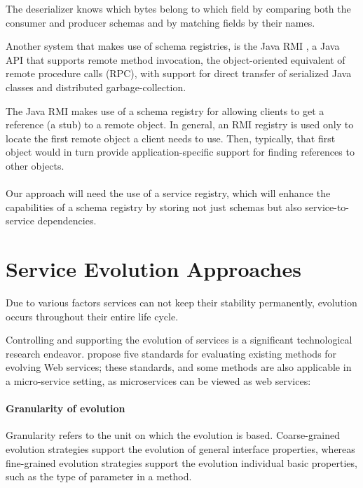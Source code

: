 The deserializer knows which bytes belong to which field by comparing both the consumer and producer schemas and by matching fields by their names.

Another system that makes use of schema registries, is the Java RMI \cite{12}, a Java API that supports remote method invocation,
the object-oriented equivalent of remote procedure calls (RPC), with support for direct
transfer of serialized Java classes and distributed garbage-collection.

The Java RMI makes use of a schema registry for allowing clients to get a reference (a stub) to a remote object.
In general, an RMI registry is used only to locate the first remote object a client needs to use.
Then, typically, that first object would in turn provide application-specific support for finding references to other objects.

\paragraph{}

Our approach will need the use of a service registry, which will enhance the capabilities of a schema registry by storing not just schemas but also service-to-service dependencies.

\section{Service Evolution Approaches} %
\label{sec:service_evolution_approaches}

Due to various factors services can not keep their stability
permanently, evolution occurs throughout their entire life cycle.

Controlling and supporting the evolution of services is a significant technological research endeavor.
\citeauthor{webServiceEvolution} propose five standards for evaluating existing methods for evolving Web services;
these standards, and some methods are also applicable in a micro-service setting, as microservices can be viewed as web services:

\paragraph{Granularity of evolution}
Granularity refers to the unit on which the evolution is based.
Coarse-grained evolution strategies support the evolution of general interface properties,
whereas fine-grained evolution strategies support the evolution individual basic properties, such as the type of parameter in a method.


